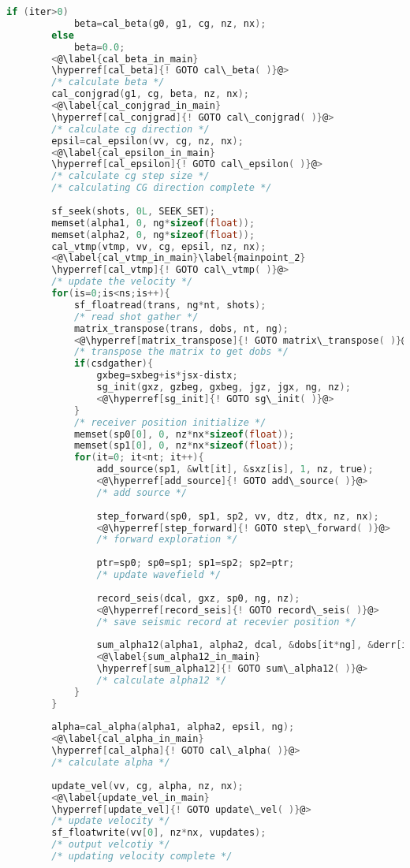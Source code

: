 \documentclass[a4paper,11pt]{article}
\theoremstyle{mytheor}
\begin{document}
\begin{lstlisting}[label={main},language=C,tabsize=4,caption=main()]
		if (iter>0) 
			beta=cal_beta(g0, g1, cg, nz, nx); 
		else 
			beta=0.0;
		<@\label{cal_beta_in_main}
		\hyperref[cal_beta]{! GOTO cal\_beta( )}@>
		/* calculate beta */
		cal_conjgrad(g1, cg, beta, nz, nx);
		<@\label{cal_conjgrad_in_main}
		\hyperref[cal_conjgrad]{! GOTO cal\_conjgrad( )}@>
		/* calculate cg direction */
		epsil=cal_epsilon(vv, cg, nz, nx);
		<@\label{cal_epsilon_in_main}
		\hyperref[cal_epsilon]{! GOTO cal\_epsilon( )}@>
		/* calculate cg step size */
		/* calculating CG direction complete */
		
		sf_seek(shots, 0L, SEEK_SET);
		memset(alpha1, 0, ng*sizeof(float));
		memset(alpha2, 0, ng*sizeof(float));
		cal_vtmp(vtmp, vv, cg, epsil, nz, nx);
		<@\label{cal_vtmp_in_main}\label{mainpoint_2}
		\hyperref[cal_vtmp]{! GOTO cal\_vtmp( )}@>
		/* update the velocity */
		for(is=0;is<ns;is++){
			sf_floatread(trans, ng*nt, shots);
			/* read shot gather */
			matrix_transpose(trans, dobs, nt, ng);
			<@\hyperref[matrix_transpose]{! GOTO matrix\_transpose( )}@>
			/* transpose the matrix to get dobs */
			if(csdgather){
				gxbeg=sxbeg+is*jsx-distx;
				sg_init(gxz, gzbeg, gxbeg, jgz, jgx, ng, nz);
				<@\hyperref[sg_init]{! GOTO sg\_init( )}@>
			}
			/* receiver position initialize */
			memset(sp0[0], 0, nz*nx*sizeof(float));
			memset(sp1[0], 0, nz*nx*sizeof(float));
			for(it=0; it<nt; it++){
				add_source(sp1, &wlt[it], &sxz[is], 1, nz, true);
				<@\hyperref[add_source]{! GOTO add\_source( )}@>
				/* add source */
								
				step_forward(sp0, sp1, sp2, vv, dtz, dtx, nz, nx);
				<@\hyperref[step_forward]{! GOTO step\_forward( )}@>
				/* forward exploration */
				
				ptr=sp0; sp0=sp1; sp1=sp2; sp2=ptr;
				/* update wavefield */
				
				record_seis(dcal, gxz, sp0, ng, nz);
				<@\hyperref[record_seis]{! GOTO record\_seis( )}@>
				/* save seismic record at recevier position */
				
				sum_alpha12(alpha1, alpha2, dcal, &dobs[it*ng], &derr[is*ng*nt+it*ng], ng);
				<@\label{sum_alpha12_in_main}
				\hyperref[sum_alpha12]{! GOTO sum\_alpha12( )}@>
				/* calculate alpha12 */
			}
		}
	
		alpha=cal_alpha(alpha1, alpha2, epsil, ng);
		<@\label{cal_alpha_in_main}
		\hyperref[cal_alpha]{! GOTO cal\_alpha( )}@>
		/* calculate alpha */
		
		update_vel(vv, cg, alpha, nz, nx);
		<@\label{update_vel_in_main}
		\hyperref[update_vel]{! GOTO update\_vel( )}@>
		/* update velocity */
		sf_floatwrite(vv[0], nz*nx, vupdates);
		/* output velcotiy */
		/* updating velocity complete */


\end{lstlisting}
\end{document}
